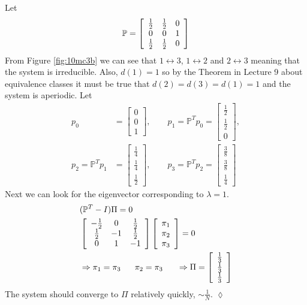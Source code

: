 \begin{example}
Let
$$\mathbb{P} = \left[\begin{array}{c c c} \frac{1}{2} & \frac{1}{2} & 0 \\ 0 & 0 & 1 \\ \frac{1}{2} & \frac{1}{2} & 0 \end{array}\right]$$
From Figure \ref{fig:10mc3b} we can see that $1\leftrightarrow 3$, $1\leftrightarrow 2$ and $2\leftrightarrow 3$ meaning that the system is irreducible. Also, $d(1)=1$ so by the Theorem in Lecture 9 about equivalence classes it must be true that $d(2)=d(3)=d(1)=1$ and the system is aperiodic. Let
\begin{align*}
p_0 &= \left[\begin{array}{c} 0 \\ 0 \\ 1 \end{array}\right],
\qquad p_1 = \mathbb{P}^Tp_0 = \left[\begin{array}{c} \frac{1}{2} \\ \frac{1}{2} \\ 0 \end{array}\right], \\
p_2 = \mathbb{P}^Tp_1 &= \left[\begin{array}{c} \frac{1}{4} \\ \frac{1}{4} \\ \frac{1}{2} \end{array}\right],
\qquad p_3 = \mathbb{P}^Tp_2 = \left[\begin{array}{c} \frac{3}{8} \\ \frac{3}{8} \\ \frac{1}{4} \end{array}\right]
\end{align*}
Next we can look for the eigenvector corresponding to $\lambda=1$.
\begin{align*}
&(\mathbb{P}^T-I)\Pi = 0 \\
&\left[\begin{array}{c c c} -\frac{1}{2} & 0 & \frac{1}{2} \\ \frac{1}{2} & -1 & \frac{1}{2} \\ 0 & 1 & -1 \end{array}\right]
\left[\begin{array}{c} \pi_1 \\ \pi_2 \\ \pi_3 \end{array}\right] = 0 \\
&\Rightarrow \pi_1=\pi_3 ~~~~~ \pi_2=\pi_3 ~~~~~ \Rightarrow \Pi=\left[\begin{array}{c} \frac{1}{3} \\ \frac{1}{3} \\ \frac{1}{3} \end{array}\right]
\end{align*}
The system should converge to $\Pi$ relatively quickly, $\sim\frac{1}{N}$.
$\lozenge$
\end{example}

